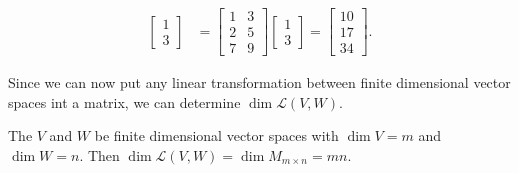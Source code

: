 \begin{answer}
\begin{align*}
\begin{bmatrix}
			1 \\ 3
		\end{bmatrix} &= \begin{bmatrix}
			1 & 3 \\
			2 & 5 \\
			7 & 9
		\end{bmatrix}\begin{bmatrix}
			1 \\ 3
		\end{bmatrix} = \begin{bmatrix}
			10 \\ 17 \\ 34
		\end{bmatrix}.
	\end{align*}
\end{answer}

Since we can now put any linear transformation between finite dimensional vector spaces int a matrix, we can determine $\dim{\mathcal{L}(V,W)}$.
\begin{corollary}
	The $V$ and $W$ be finite dimensional vector spaces with $\dim{V} = m$ and $\dim{W} = n$.
	Then $\dim{\mathcal{L}(V,W)} = \dim{M_{m\times n}} = mn$.
\end{corollary}